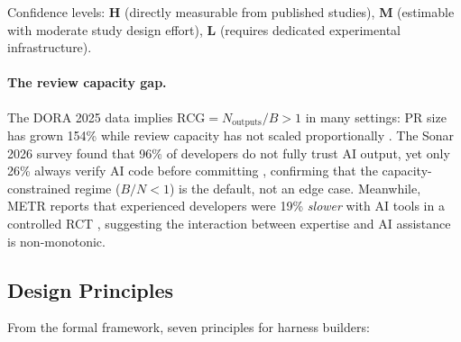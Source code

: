 \documentclass[11pt, a4paper]{googledeepmind}
\begin{document}
Confidence levels: \textbf{H} (directly measurable from published studies), \textbf{M} (estimable with moderate study design effort), \textbf{L} (requires dedicated experimental infrastructure).

\paragraph{The review capacity gap.} The DORA 2025 data implies $\text{RCG} = N_{\text{outputs}} / B > 1$ in many settings: PR size has grown 154\% while review capacity has not scaled proportionally \citep{dora2025}. The Sonar 2026 survey found that 96\% of developers do not fully trust AI output, yet only 26\% always verify AI code before committing \citep{sonar2026}, confirming that the capacity-constrained regime ($B/N < 1$) is the default, not an edge case. Meanwhile, METR reports that experienced developers were 19\% \emph{slower} with AI tools in a controlled RCT \citep{metr2026}, suggesting the interaction between expertise and AI assistance is non-monotonic.

\subsection{Design Principles}

From the formal framework, seven principles for harness builders:
\end{document}

